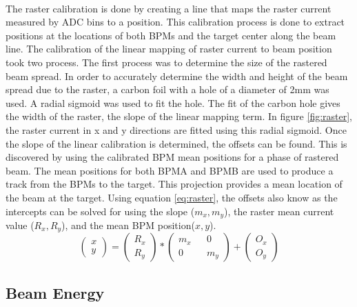 	 \paragraph{}
	 The raster calibration is done by creating a line that maps the raster current measured by ADC bins to a position. This calibration process is done to extract positions at the locations of both BPMs and the target center along the beam line. The calibration of the linear mapping of raster current to beam position took two process. The first process was to determine the size of the rastered beam spread. In order to accurately determine the width and height of the beam spread due to the raster, a carbon foil with a hole of a diameter of 2mm was used. A radial sigmoid was used to fit the hole. The fit of the carbon hole gives the width of the raster, the slope of the linear mapping term. In figure \ref{fig:raster}, the raster current in x and y directions are fitted using this radial sigmoid. Once the slope of the linear calibration is determined, the offsets can be found. This is discovered by using the calibrated BPM mean positions for a phase of rastered beam. The mean positions for both BPMA and BPMB are used to produce a track from the BPMs to the target. This projection provides a mean location of the beam at the target.  Using equation \ref{eq:raster}, the offsets also know as the intercepts can be solved for using the slope ($m_x,m_y$), the raster mean current value ($R_x,R_y$), and the mean BPM position($x,y$).  \cite{Trast} 
	 \begin{equation}
	 	\begin{pmatrix}
	 	x\\
	 	y
	 	\end{pmatrix}
	 	=
	 	\begin{pmatrix}
	 	R_x\\
	 	R_y
	 	\end{pmatrix}
	 	*
	 	\begin{pmatrix}
		m_x && 0 \\
		0  && m_y
	 	\end{pmatrix}
	 	+
	 	\begin{pmatrix}
	 	O_x\\
	 	O_y
	 	\end{pmatrix}
	 	\label{eq:raster}
	 \end{equation}

 
	 \subsection{Beam Energy}
